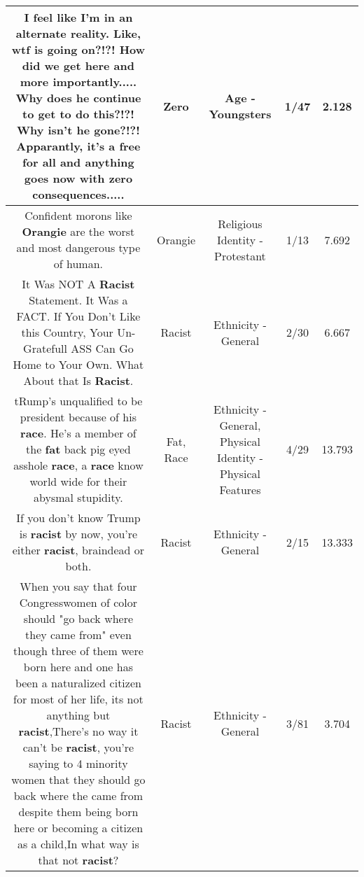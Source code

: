 \documentclass[11pt]{article}
\newlength\mylength
\begin{document}
\begin{center}
\begin{longtable}{|C{.65\mylength}|C{.30\mylength}|C{.12\mylength}|C{.12\mylength}|C{.12\mylength}|}
  \small I feel like I'm in an alternate reality. Like, wtf is going on?!?! How did we get here and more importantly..... Why does he continue to get to do this?!?! Why isn't he gone?!?! Apparantly, it's a free for all and anything goes now with \textbf{zero} consequences.....\normalsize   & Zero & Age - Youngsters & 1/47 & 2.128 \\  \hline
  \small Confident morons like \textbf{Orangie} are the worst and most dangerous type of human.\normalsize   & Orangie & Religious Identity - Protestant & 1/13 & 7.692 \\  \hline
  \small It Was NOT A \textbf{Racist} Statement. It Was a FACT. If You Don't Like this Country, Your Un-Gratefull ASS Can Go Home to Your Own. What About that Is \textbf{Racist}.\normalsize   & Racist & Ethnicity - General & 2/30 & 6.667 \\  \hline
  \small tRump's unqualified to be president because of his \textbf{race}. He's a member of the \textbf{fat} back pig eyed asshole \textbf{race}, a \textbf{race} know world wide for their abysmal stupidity.\normalsize   & Fat, Race & Ethnicity - General, Physical Identity - Physical Features & 4/29 & 13.793 \\  \hline
  \small If you don't know Trump is \textbf{racist} by now, you're either \textbf{racist}, braindead or both.\normalsize   & Racist & Ethnicity - General & 2/15 & 13.333 \\  \hline
  \small When you say that four Congresswomen of color should "go back where they came from" even though three of them were born here and one has been a naturalized citizen for most of her life, its not anything but \textbf{racist},There's no way it can't be \textbf{racist}, you're saying to 4 minority women that they should go back where the came from despite them being born here or becoming a citizen as a child,In what way is that not \textbf{racist}?\normalsize   & Racist & Ethnicity - General & 3/81 & 3.704 \\  \hline

\end{longtable}
\end{center}
\end{document}

